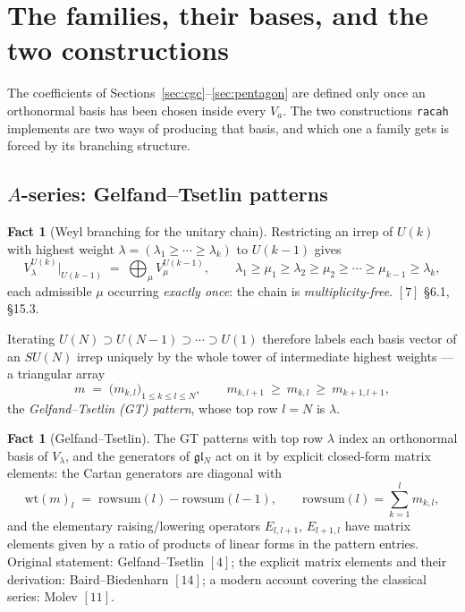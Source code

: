 \documentclass[11pt,a4paper]{article}
\theoremstyle{plain}
\theoremstyle{definition}
\newtheorem{fact}[theorem]{Fact}
\newcommand{\g}{\mathfrak{g}}
\newcommand{\code}[1]{\texttt{#1}}
\begin{document}
\section{The families, their bases, and the two constructions}
\label{sec:constructions}

The coefficients of Sections~\ref{sec:cgc}--\ref{sec:pentagon} are defined only
once an orthonormal basis has been chosen inside every $V_a$. The two
constructions \code{racah} implements are two ways of producing that basis, and
which one a family gets is forced by its branching structure.

\subsection{$A$-series: Gelfand--Tsetlin patterns}
\label{sec:gt}

\begin{fact}[Weyl branching for the unitary chain]\label{fact:branch}
Restricting an irrep of $U(k)$ with highest weight
$\lambda=(\lambda_1\ge\cdots\ge\lambda_k)$ to $U(k-1)$ gives
\[
  V^{U(k)}_\lambda\big|_{U(k-1)} \;=\; \bigoplus_{\mu} V^{U(k-1)}_\mu,
  \qquad
  \lambda_1 \ge \mu_1 \ge \lambda_2 \ge \mu_2 \ge \cdots \ge \mu_{k-1} \ge \lambda_k,
\]
each admissible $\mu$ occurring \emph{exactly once}: the chain is
\emph{multiplicity-free}. $[7]$ \S6.1, \S15.3.
\end{fact}

Iterating $U(N)\supset U(N-1)\supset\cdots\supset U(1)$ therefore labels each
basis vector of an $SU(N)$ irrep uniquely by the whole tower of intermediate
highest weights --- a triangular array
\[
  m \;=\;
  \bigl( m_{k,l} \bigr)_{1\le k\le l\le N},
  \qquad
  m_{k,l+1} \ \ge\ m_{k,l} \ \ge\ m_{k+1,l+1},
\]
the \emph{Gelfand--Tsetlin (GT) pattern}, whose top row $l=N$ is $\lambda$.

\begin{fact}[Gelfand--Tsetlin]\label{fact:gt}
The GT patterns with top row $\lambda$ index an orthonormal basis of
$V_\lambda$, and the generators of $\g\mathfrak{l}_N$ act on it by explicit
closed-form matrix elements: the Cartan generators are diagonal with
\[
  \mathrm{wt}(m)_l \;=\; \mathrm{rowsum}(l) - \mathrm{rowsum}(l-1),
  \qquad \mathrm{rowsum}(l) = \sum_{k=1}^{l} m_{k,l},
\]
and the elementary raising/lowering operators $E_{l,l+1}$, $E_{l+1,l}$ have
matrix elements given by a ratio of products of linear forms in the pattern
entries. Original statement: Gelfand--Tsetlin $[4]$; the explicit matrix
elements and their derivation: Baird--Biedenharn $[14]$; a modern account
covering the classical series: Molev $[11]$.
\end{fact}
\end{document}
